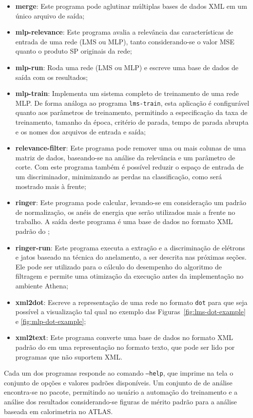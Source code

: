 \begin{itemize}
\item \textbf{merge}: Este programa pode aglutinar múltiplas bases de dados
XML em um único arquivo de saída; 

\item \textbf{mlp-relevance}: Este programa avalia a relevância das
características de entrada de uma rede (LMS ou MLP), tanto considerando-se o
valor MSE quanto o produto SP originais da rede;

\item \textbf{mlp-run}: Roda uma rede (LMS ou MLP) e escreve uma base de dados
de saída com os resultados;

\item \textbf{mlp-train}: Implementa um sistema completo de treinamento de 
uma rede MLP. De forma análoga ao programa \texttt{lms-train}, esta aplicação
é configurável quanto aos parâmetros de treinamento, permitindo a
especificação da taxa de treinamento, tamanho da época, critério de parada,
tempo de parada abrupta e os nomes dos arquivos de entrada e saída;

\item \textbf{relevance-filter}: Este programa pode remover uma ou mais
colunas de uma matriz de dados, baseando-se na análise da relevância e um
parâmetro de corte. Com este programa também é possível reduzir o espaço de
entrada de um discriminador, minimizando as perdas na classificação, como será
mostrado mais à frente;

\item \textbf{ringer}: Este programa pode calcular, levando-se em consideração
um padrão de normalização, os anéis de energia que serão utilizados mais a
frente no trabalho. A saída deste programa é uma base de dados no formato XML
padrão do ;

\item \textbf{ringer-run}: Este programa executa a extração e a discriminação de
elétrons e jatos baseado na técnica do anelamento, a ser descrita nas próximas
seções. Ele pode ser utilizado para o cálculo do desempenho do algoritmo de
filtragem  e permite uma otimização da execução antes da
implementação no ambiente Athena;

\item \textbf{xml2dot}: Escreve a representação de uma rede no formato
\texttt{dot} para que seja possível a visualização tal qual no exemplo das
Figuras~\ref{fig:lms-dot-example} e \ref{fig:mlp-dot-example};

\item \textbf{xml2text}: Este programa converte uma base de dados no formato
XML padrão do  em uma representação no formato texto, que
pode ser lido por programas que não suportem XML.
\end{itemize}

Cada um dos programas responde ao comando \texttt{--help}, que imprime na tela
o conjunto de opções e valores padrões disponíveis. Um conjunto de
 de análise encontra-se no pacote, permitindo ao usuário
a automação do treinamento e a análise dos resultados considerando-se figuras
de mérito padrão para a análise baseada em calorimetria no ATLAS.

